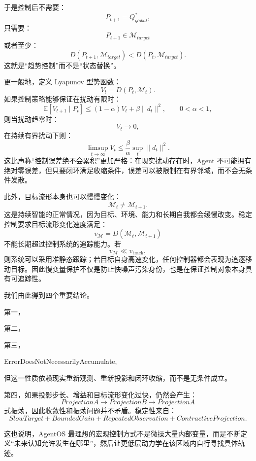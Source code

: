 于是控制后不需要：
\[
P_{t+1}
=
Q_{global}^{*},
\]
只需要：
\[
P_{t+1}
\in
\mathcal M_{target}
\]
或者至少：
\[
D(P_{t+1},\mathcal M_{target})
<
D(P_t,\mathcal M_{target}).
\]
这就是“趋势控制”而不是“状态替换”。

更一般地，定义 Lyapunov 型势函数：
\[
V_t
=
D
\left(
P_t,
\mathcal M_t
\right).
\]
如果控制策略能够保证在扰动有限时：
\[
\mathbb E
[
V_{t+1}
\mid
P_t
]
\le
(1-\alpha)V_t
+
\beta\|d_t\|^2,
\qquad
0<\alpha<1,
\]
则当扰动趋零时：
\[
V_t\rightarrow0,
\]
在持续有界扰动下则：
\[
\limsup_{t\rightarrow\infty}
V_t
\le
\frac{\beta}{\alpha}
\sup_t\|d_t\|^2.
\]
这比声称“控制误差绝不会累积”更加严格：在现实扰动存在时，Agent 不可能拥有绝对零误差，但只要闭环满足收缩条件，误差可以被限制在有界邻域，而不会无条件发散。

此外，目标流形本身也可以慢慢变化：
\[
\mathcal M_t
\neq
\mathcal M_{t+1}.
\]
这是持续智能的正常情况，因为目标、环境、能力和长期自我都会缓慢改变。稳定控制要求目标流形变化速度满足：
\[
v_{\mathcal M}
=
D
\left(
\mathcal M_t,
\mathcal M_{t+1}
\right)
\]
不能长期超过控制系统的追踪能力。若
\[
v_{\mathcal M}
\ll
v_{\mathrm{track}},
\]
则系统可以采用准静态跟踪；若目标自身高速变化，任何控制器都会表现为追逐移动目标。因此慢变量保护不仅是防止快噪声污染身份，也是在保证控制对象本身具有可追踪性。

我们由此得到四个重要结论。

第一，
\begin{statementbox}
\centering
{}
\end{statementbox}

第二，
\begin{statementbox}
\centering
{}
\end{statementbox}

第三，
\begin{statementbox}
ErrorDoesNotNecessarilyAccumulate,
\end{statementbox}
但这一性质依赖现实重新观测、重新投影和闭环收缩，而不是无条件成立。

第四，如果投影步长、增益和目标流形变化过快，仍然会产生：
\[
ProjectionA
\rightarrow
ProjectionB
\rightarrow
ProjectionA
\]
式振荡，因此收敛性和振荡问题并不矛盾。稳定性来自：
\[
\boxed{
SlowTarget
+
BoundedGain
+
RepeatedObservation
+
ContractiveProjection.
}
\]

这也说明，AgentOS 最理想的宏观控制方式不是微操大量内部变量，而是不断定义“未来认知允许发生在哪里”，然后让更低层动力学在该区域内自行寻找具体轨迹。

